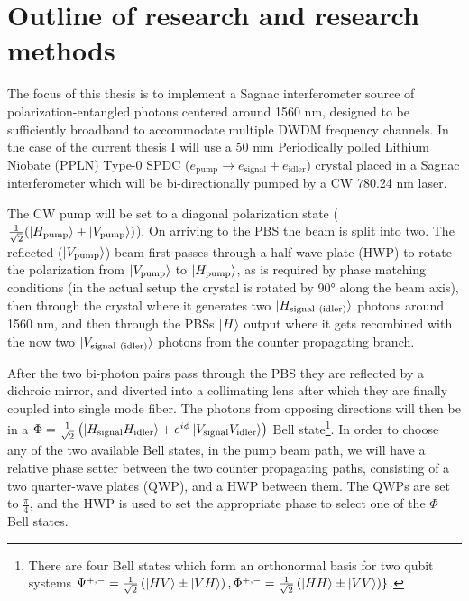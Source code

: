 \documentclass{article}
\begin{document}
\section{Outline of research and research methods}
The focus of this thesis is to implement a Sagnac interferometer source of polarization-entangled photons centered around 1560 nm,
designed to be sufficiently broadband to accommodate multiple DWDM frequency channels.
In the case of the current thesis I will use a 50 mm Periodically polled Lithium Niobate (PPLN)
Type-0 SPDC ($e_{\mathrm{pump}} \rightarrow e_{\mathrm{signal}} + e_{\mathrm{idler}}$) crystal placed in a Sagnac interferometer
which will be bi-directionally pumped by a CW 780.24 nm laser.
\par The CW pump will be set to a diagonal polarization state ($\frac{1}{\sqrt{2}}(\ket{H_{\mathrm{pump}}} + \ket{V_{\mathrm{pump}}})$). On arriving to the
PBS the beam is split into two. The reflected ($\ket{V_{\mathrm{pump}}}$) beam first passes through a half-wave plate (HWP) to rotate the
polarization from $\ket{V_{\mathrm{pump}}}$ to $\ket{H_{\mathrm{pump}}}$, as is required by phase matching conditions (in the actual setup the crystal is rotated by 90° along the beam axis), then through
the crystal where it generates two $\ket{H_{\mathrm{signal}\ (\mathrm{idler})}}$ photons around 1560 nm, and then through the PBSs $\ket{H}$ output where it gets recombined
with the now two $\ket{V_{\mathrm{signal}\ (\mathrm{idler})}}$ photons from the counter propagating branch.

After the two bi-photon pairs pass through the PBS they are reflected by a dichroic mirror, and diverted into a collimating lens
after which they are finally coupled into single mode fiber. The photons from opposing directions will then be in a
$\Phi = \frac{1}{\sqrt{2}}\left( \ket{H_{\mathrm{signal}}H_{\mathrm{idler}}} + e^{i \phi}\ket{V_{\mathrm{signal}}V_{\mathrm{idler}}}\right)$ Bell state\footnote{There
	are four Bell states which form an orthonormal basis for two qubit systems
	$\Psi^{+,-}=\frac{1}{\sqrt{2}}\left(\ket{HV} \pm \ket{VH}\right),\\\Phi^{+,-} = \frac{1}{\sqrt{2}} \left( \ket{HH} \pm \ket{VV} \right)\}$.}.
In order to choose any of the two available Bell states, in the pump beam path, we will have
a relative phase setter between the two counter propagating paths, consisting of a two quarter-wave plates (QWP), and a HWP between them.
The QWPs are set to $\frac{\pi}{4}$, and the HWP is used to set the appropriate phase to select one of the $\Phi$ Bell states.
\end{document}
